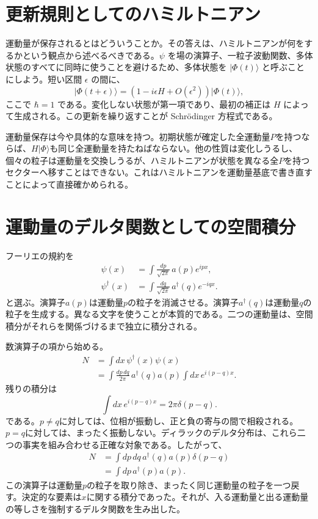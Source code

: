 \section{更新規則としてのハミルトニアン}

運動量が保存されるとはどういうことか。その答えは、ハミルトニアンが何をするかという観点から述べるべきである。\(\psi\) を場の演算子、一粒子波動関数、多体状態のすべてに同時に使うことを避けるため、多体状態を \(\lvert\Phi(t)\rangle\) と呼ぶことにしよう。短い区間 \(\epsilon\) の間に、
\begin{equation}
\lvert\Phi(t+\epsilon)\rangle
=\left(1-i\epsilon H+O(\epsilon^2)\right)
\lvert\Phi(t)\rangle,
\label{eq:l9-short-update}
\end{equation}
ここで \(\hbar=1\) である。変化しない状態が第一項であり、最初の補正は \(H\) によって生成される。この更新を繰り返すことが Schr\"odinger 方程式である。

運動量保存は今や具体的な意味を持つ。初期状態が確定した全運動量\(P\)を持つならば、\(H\lvert\Phi\rangle\)も同じ全運動量を持たねばならない。他の性質は変化しうるし、個々の粒子は運動量を交換しうるが、ハミルトニアンが状態を異なる全\(P\)を持つセクターへ移すことはできない。これはハミルトニアンを運動量基底で書き直すことによって直接確かめられる。

\section{運動量のデルタ関数としての空間積分}

フーリエの規約を
\begin{align}
\psi(x)&=\int\frac{dp}{\sqrt{2\pi}}\,a(p)e^{ipx},\\
\psi^\dagger(x)&=\int\frac{dq}{\sqrt{2\pi}}\,a^\dagger(q)e^{-iqx}.
\label{eq:l9-field-fourier}
\end{align}
と選ぶ。演算子\(a(p)\)は運動量\(p\)の粒子を消滅させる。演算子\(a^\dagger(q)\)は運動量\(q\)の粒子を生成する。異なる文字を使うことが本質的である。二つの運動量は、空間積分がそれらを関係づけるまで独立に積分される。

数演算子の項から始める。
\begin{align}
N
&=\int dx\,\psi^\dagger(x)\psi(x)\\
&=\int\frac{dp\,dq}{2\pi}\,
a^\dagger(q)a(p)
\int dx\,e^{i(p-q)x}.
\end{align}
残りの積分は
\begin{equation}
\int dx\,e^{i(p-q)x}=2\pi\delta(p-q).
\end{equation}
である。\(p\ne q\)に対しては、位相が振動し、正と負の寄与の間で相殺される。\(p=q\)に対しては、まったく振動しない。ディラックのデルタ分布は、これら二つの事実を組み合わせる正確な対象である。したがって、
\begin{align}
N
&=\int dp\,dq\,a^\dagger(q)a(p)\delta(p-q)\\
&=\int dp\,a^\dagger(p)a(p).
\label{eq:l9-number-momentum}
\end{align}
この演算子は運動量\(p\)の粒子を取り除き、まったく同じ運動量の粒子を一つ戻す。決定的な要素は\(x\)に関する積分であった。それが、入る運動量と出る運動量の等しさを強制するデルタ関数を生み出した。

